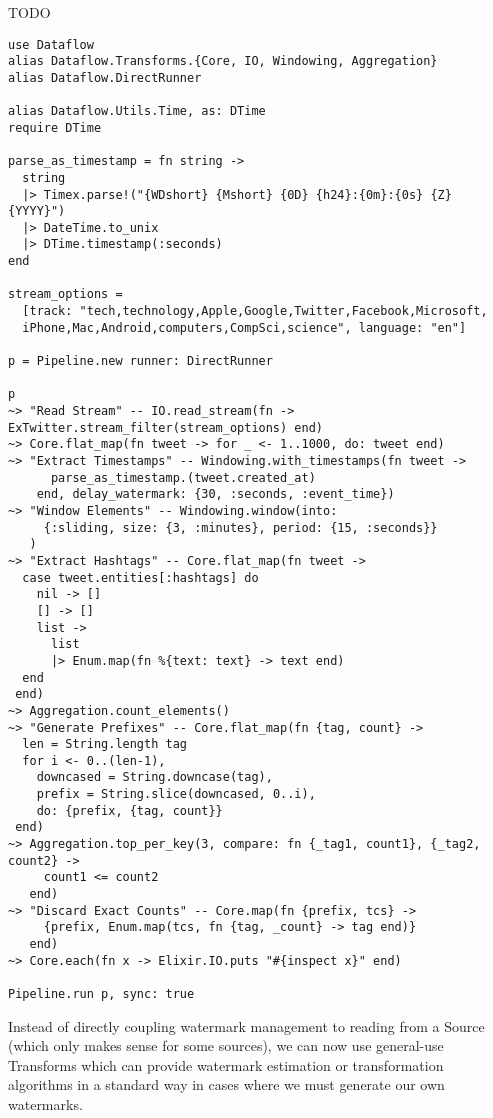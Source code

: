 \begin{listing}
\caption{TODO}
\label{lst:eval:twitter-elixir}
\begin{verbatim}
use Dataflow
alias Dataflow.Transforms.{Core, IO, Windowing, Aggregation}
alias Dataflow.DirectRunner

alias Dataflow.Utils.Time, as: DTime
require DTime

parse_as_timestamp = fn string ->
  string
  |> Timex.parse!("{WDshort} {Mshort} {0D} {h24}:{0m}:{0s} {Z} {YYYY}")
  |> DateTime.to_unix
  |> DTime.timestamp(:seconds)
end

stream_options =
  [track: "tech,technology,Apple,Google,Twitter,Facebook,Microsoft,
  iPhone,Mac,Android,computers,CompSci,science", language: "en"]

p = Pipeline.new runner: DirectRunner

p
~> "Read Stream" -- IO.read_stream(fn -> ExTwitter.stream_filter(stream_options) end)
~> Core.flat_map(fn tweet -> for _ <- 1..1000, do: tweet end)
~> "Extract Timestamps" -- Windowing.with_timestamps(fn tweet ->
      parse_as_timestamp.(tweet.created_at)
    end, delay_watermark: {30, :seconds, :event_time})
~> "Window Elements" -- Windowing.window(into:
     {:sliding, size: {3, :minutes}, period: {15, :seconds}}
   )
~> "Extract Hashtags" -- Core.flat_map(fn tweet ->
  case tweet.entities[:hashtags] do
    nil -> []
    [] -> []
    list ->
      list
      |> Enum.map(fn %{text: text} -> text end)
  end
 end)
~> Aggregation.count_elements()
~> "Generate Prefixes" -- Core.flat_map(fn {tag, count} ->
  len = String.length tag
  for i <- 0..(len-1),
    downcased = String.downcase(tag),
    prefix = String.slice(downcased, 0..i),
    do: {prefix, {tag, count}}
 end)
~> Aggregation.top_per_key(3, compare: fn {_tag1, count1}, {_tag2, count2} ->
     count1 <= count2
   end)
~> "Discard Exact Counts" -- Core.map(fn {prefix, tcs} ->
     {prefix, Enum.map(tcs, fn {tag, _count} -> tag end)}
   end)
~> Core.each(fn x -> Elixir.IO.puts "#{inspect x}" end)

Pipeline.run p, sync: true	
\end{verbatim}
	
\end{listing}





Instead of directly coupling watermark management to reading from a Source (which only makes sense for some sources), we can now use general-use Transforms which can provide watermark estimation or transformation algorithms in a standard way in cases where we must generate our own watermarks.

